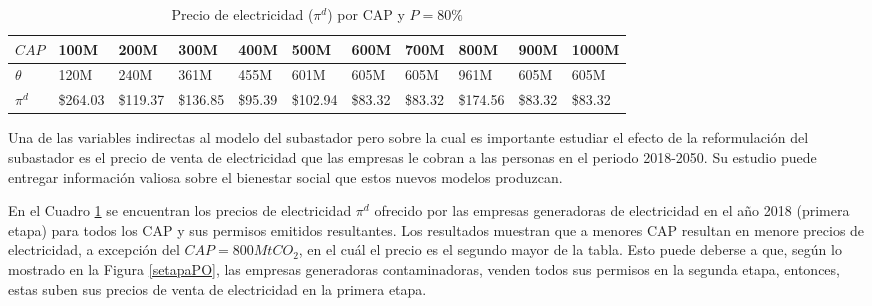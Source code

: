 \begin{table}[H]
\begin{footnotesize}
    \centering
    \begin{tabular}{|l|l|l|l|l|l|l|l|l|l|l|}
    \hline
        $CAP$ & 100M & 200M & 300M & 400M & 500M & 600M & 700M & 800M & 900M & 1000M \\ \hline
        $\theta$  & 120M & 240M & 361M & 455M & 601M & 605M & 605M & 961M & 605M & 605M \\ \hline
        $\pi^d$  &  \$264.03   &  \$119.37   &  \$136.85   &  \$95.39   &  \$102.94   &  \$83.32   &  \$83.32   &  \$174.56   &  \$83.32   &  \$83.32   \\ \hline
    \end{tabular}
    \caption{{\footnotesize Precio de electricidad ($\pi^d$) por CAP y $P=80\%$}}
    \label{POpidporcap}
\end{footnotesize}
\end{table}

Una de las variables indirectas al modelo del subastador pero sobre la cual es importante estudiar el efecto de la reformulación del subastador es el precio de venta de electricidad que las empresas le cobran a las personas en el periodo 2018-2050. Su estudio puede entregar información valiosa sobre el bienestar social que estos nuevos modelos produzcan.
\vspace{2.5mm}

En el Cuadro \ref{POpidporcap} se encuentran los precios de electricidad $\pi^d$ ofrecido por las empresas generadoras de electricidad en el año 2018 (primera etapa) para todos los CAP y sus permisos emitidos resultantes. Los resultados muestran que a menores CAP resultan en menore precios de electricidad, a excepción del $CAP= 800MtCO_2$, en el cuál el precio es el segundo mayor de la tabla. Esto puede deberse a que, según lo mostrado en la Figura \ref{setapaPO}, las empresas generadoras contaminadoras, venden todos sus permisos en la segunda etapa, entonces, estas suben sus precios de venta de electricidad en la primera etapa.
\vspace{2.5mm}

